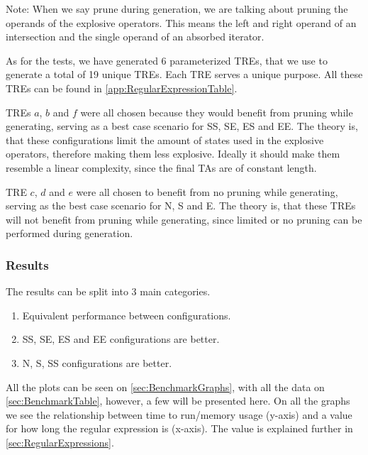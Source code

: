 Note: When we say prune during generation, we are talking about pruning the operands of the explosive operators.
This means the left and right operand of an intersection and the single operand of an absorbed iterator.

\vspace{.5\baselineskip plus 2pt}
As for the tests, we have generated 6 parameterized TREs, that we use to generate a total of 19 unique TREs.
Each TRE serves a unique purpose.
All these TREs can be found in \cref{app:RegularExpressionTable}.

\vspace{.5\baselineskip plus 2pt}
TREs $a$, $b$ and $f$ were all chosen because they would benefit from pruning while generating, serving as a best case scenario for SS, SE, ES and EE.
The theory is, that these configurations limit the amount of states used in the explosive operators, therefore making them less explosive.
Ideally it should make them resemble a linear complexity, since the final TAs are of constant length.

\vspace{.5\baselineskip plus 2pt}
TRE $c$, $d$ and $e$ were all chosen to benefit from no pruning while generating, serving as the best case scenario for N, S and E.
The theory is, that these TREs will not benefit from pruning while generating, since limited or no pruning can be performed during generation.

\newpage
\subsubsection{Results}
The results can be split into 3 main categories.

\vspace{0.75em}
\begin{enumerate}
    \setlength\itemsep{0em}
    \item Equivalent performance between configurations.
    \item SS, SE, ES and EE configurations are better.
    \item N, S, SS configurations are better.
\end{enumerate}
\vspace{0.75em}

All the plots can be seen on \cref{sec:BenchmarkGraphs}, with all the data on \cref{sec:BenchmarkTable}, however, a few will be presented here.
On all the graphs we see the relationship between time to run/memory usage (y-axis) and a value for how long the regular expression is (x-axis). The value is explained further in \cref{sec:RegularExpressions}.

